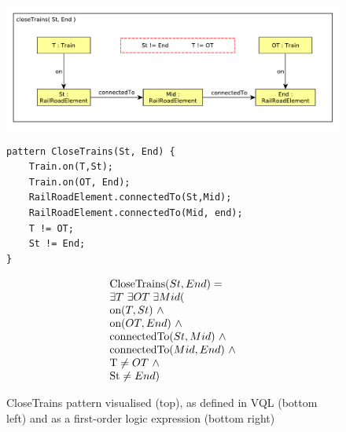\begin{figure}[H]
	\begin{center}
		
		\begin{minipage}[c]{\textwidth}
			\begin{minipage}[r]{\textwidth}
				\hfill
				\includegraphics[width=\textwidth]{figures/closeTrains-pattern.pdf}
			\end{minipage}
			\hfill
			\begin{minipage}[c]{0.45\textwidth}
\begin{lstlisting}[language=vql]
pattern CloseTrains(St, End) {
	Train.on(T,St);
	Train.on(OT, End);
	RailRoadElement.connectedTo(St,Mid);
	RailRoadElement.connectedTo(Mid, end);
	T != OT;
	St != End;
}
\end{lstlisting}			
			\end{minipage}
			\hfill
			\begin{minipage}[l]{0.45\textwidth}
				
\begin{equation*}
\begin{array}{@{}l@{}}

\text{CloseTrains}(St, End) = \\
\exists{T} \  \exists{OT}\; \exists{Mid} ( \\
\text{on}(T, St)  \  \wedge \\
\text{on}(OT, End)  \  \wedge \\
\text{connectedTo}(St, Mid)  \  \wedge \\
\text{connectedTo}(Mid, End)  \  \wedge \\
\text{T} \neq OT  \  \wedge \\
\text{St} \neq End )
\end{array}
\end{equation*}
			
			\end{minipage}
		\end{minipage}
		\caption{CloseTrains pattern visualised (top), as defined in VQL (bottom left) and as a first-order logic expression (bottom right)}
		\label{fig:pattern-visual}
	\end{center}
\end{figure}



